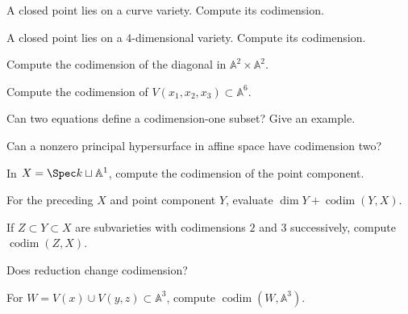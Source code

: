 \begin{exercise}[VI.31.E12]\label{exer:vi31-12}
A closed point lies on a curve variety. Compute its codimension.
\end{exercise}

\begin{exercise}[VI.31.E13]\label{exer:vi31-13}
A closed point lies on a $4$-dimensional variety. Compute its codimension.
\end{exercise}

\begin{exercise}[VI.31.E14]\label{exer:vi31-14}
Compute the codimension of the diagonal in $\mathbb A^2\times\mathbb A^2$.
\end{exercise}

\begin{exercise}[VI.31.E15]\label{exer:vi31-15}
Compute the codimension of $V(x_1,x_2,x_3)\subset\mathbb A^6$.
\end{exercise}

\begin{exercise}[VI.31.E16]\label{exer:vi31-16}
Can two equations define a codimension-one subset? Give an example.
\end{exercise}

\begin{exercise}[VI.31.E17]\label{exer:vi31-17}
Can a nonzero principal hypersurface in affine space have codimension two?
\end{exercise}

\begin{exercise}[VI.31.E18]\label{exer:vi31-18}
In $X=\Spec k\sqcup\mathbb A^1$, compute the codimension of the point component.
\end{exercise}

\begin{exercise}[VI.31.E19]\label{exer:vi31-19}
For the preceding $X$ and point component $Y$, evaluate $\dim Y+\operatorname{codim}(Y,X)$.
\end{exercise}

\begin{exercise}[VI.31.E20]\label{exer:vi31-20}
If $Z\subset Y\subset X$ are subvarieties with codimensions $2$ and $3$ successively, compute $\operatorname{codim}(Z,X)$.
\end{exercise}

\begin{exercise}[VI.31.E21]\label{exer:vi31-21}
Does reduction change codimension?
\end{exercise}

\begin{exercise}[VI.31.E22]\label{exer:vi31-22}
For $W=V(x)\cup V(y,z)\subset\mathbb A^3$, compute $\operatorname{codim}(W,\mathbb A^3)$.
\end{exercise}

